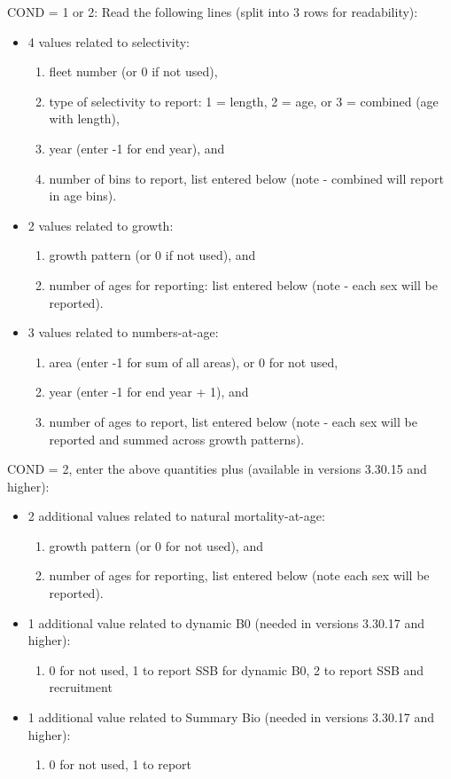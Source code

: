 COND = 1 or 2: Read the following lines (split into 3 rows for readability):
\begin{itemize}
	\item 4 values related to selectivity:
	\begin{enumerate}
		\item fleet number (or 0 if not used),
		\item type of selectivity to report: 1 = length, 2 = age, or 3 = combined (age with length),
		\item year (enter -1 for end year), and
		\item number of bins to report, list entered below (note - combined will report in age bins).
	\end{enumerate}	
	\item 2 values related to growth:
	\begin{enumerate}
		\item growth pattern (or 0 if not used), and
		\item number of ages for reporting: list entered below (note - each sex will be reported).
	\end{enumerate}	
	\item 3 values related to numbers-at-age:
	\begin{enumerate}
		\item area (enter -1 for sum of all areas), or 0 for not used,
		\item year (enter -1 for end year + 1), and
		\item number of ages to report, list entered below (note - each sex will be reported and summed across growth patterns).
	\end{enumerate}
\end{itemize}

COND = 2, enter the above quantities plus (available in versions 3.30.15 and higher):  
\begin{itemize}
	\item 2 additional values related to natural mortality-at-age:
	\begin{enumerate}
		\item growth pattern (or 0 for not used), and
		\item number of ages for reporting, list entered below (note each sex will be reported).
	\end{enumerate}
	\item 1 additional value related to dynamic B0 (needed in versions 3.30.17 and higher):
	\begin{enumerate}
		\item 0 for not used, 1 to report SSB for dynamic B0, 2 to report SSB and recruitment
	\end{enumerate}
	\item 1 additional value related to Summary Bio (needed in versions 3.30.17 and higher):
	   \begin{enumerate}
	     \item 0 for not used, 1 to report
	   \end{enumerate}
	   
\end{itemize}

